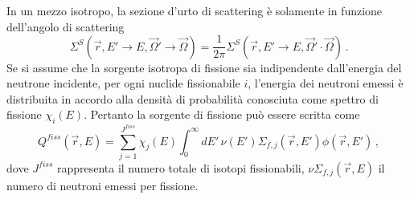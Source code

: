 In un mezzo isotropo, la sezione d'urto di scattering è solamente in funzione 
dell'angolo di scattering
\begin{equation}
\label{sorgfiss}
\Sigma^S(\vec{r},E'\rightarrow E,\vec{\Omega}'\rightarrow 
\vec{\Omega})=\frac{1}{2\pi}\Sigma^S(\vec{r},E'\rightarrow E,\vec{\Omega}'\cdot 
\vec{\Omega}) \,.
\end{equation}
Se si assume che la sorgente isotropa di fissione sia indipendente dall'energia 
del neutrone incidente, per ogni nuclide fissionabile $i$, l'energia dei 
neutroni emessi è distribuita in accordo alla densità di probabilità conosciuta 
come spettro di fissione $\chi_i(E)$. 
Pertanto la sorgente di fissione può essere scritta come
\begin{equation}
Q^{fiss}(\vec{r},E)=\sum_{j=1}^{J^{fiss}} \chi_j(E) \int_0^\infty dE'\, \nu(E') 
\Sigma_{f,j}(\vec{r},E')\phi(\vec{r},E')   \,,
\end{equation}
dove $J^{fiss}$ rappresenta il numero totale di isotopi fissionabili, $\nu 
\Sigma_{f,j}(\vec{r},E)$ il numero di neutroni emessi per fissione.




